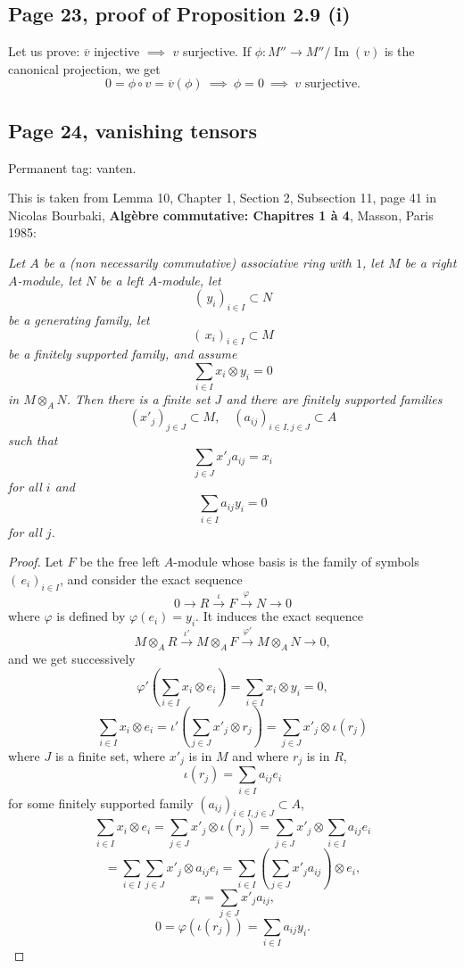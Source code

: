 \documentclass[parskip=half,fontsize=12pt]{scrartcl}%
\newcommand{\oo}{\operatorname}\newcommand{\ooo}{\operatorname*}
\begin{document}
\subsection{Page 23, proof of Proposition 2.9 (i)}%

Let us prove: $\overline v$ injective $\implies$ $v$ surjective. If $\phi:M''\to M''/\oo{Im}(v)$ is the canonical projection, we get 
$$
0=\phi\circ v=\overline v(\phi)\ \implies\ \phi=0\ \implies\ v\text{ surjective.}
$$

\subsection{Page 24, vanishing tensors}\label{vt}%

Permanent tag: vanten.

This is taken from Lemma 10, Chapter 1, Section 2, Subsection 11, page 41 in Nicolas Bourbaki, \textbf{Algèbre commutative: Chapitres 1 à 4}, Masson, Paris 1985:

\emph{Let $A$ be a (non necessarily commutative) associative ring with $1$, let $M$ be a right $A$-module, let $N$ be a left $A$-module, let 
$$
(\,y_i)_{i\in I}\subset N
$$ 
be a generating family, let 
$$
(\,x_i)_{i\in I}\subset M
$$ 
be a finitely supported family, and assume 
$$
\sum_{i\in I}x_i\otimes y_i=0
$$ 
in $M\otimes_AN$. Then there is a finite set $J$ and there are finitely supported families 
$$
(x'_j)_{j\in J}\subset M,\quad(a_{ij})_{i\in I,j\in J}\subset A
$$ 
such that 
$$
\sum_{j\in J} x'_ja_{ij}=x_i
$$ 
for all $i$ and 
$$
\sum_{i\in I}a_{ij}y_i=0
$$ 
for all $j$.}

\begin{proof} 
Let $F$ be the free left $A$-module whose basis is the family of symbols $(\,e_i)_{i\in I}$, and consider the exact sequence 
$$
0\to R\xrightarrow\iota F\xrightarrow\varphi N\to 0
$$ 
where $\varphi$ is defined by $\varphi(e_i)=y_i$. It induces the exact sequence 
$$
M\otimes_AR\xrightarrow{\iota'}M\otimes_AF\xrightarrow{\varphi'}M\otimes_AN\to 0,
$$ 
and we get successively
$$
\varphi'\left(\sum_{i\in I}x_i\otimes e_i\right)=\sum_{i\in I}x_i\otimes y_i=0,
$$ 
$$
\sum_{i\in I}x_i\otimes e_i=\iota'\left(\sum_{j\in J}x'_j\otimes r_j\right)=\sum_{j\in J}x'_j\otimes\iota(r_j)
$$ 
where $J$ is a finite set, where $x'_j$ is in $M$ and where $r_j$ is in $R$, 
$$
\iota(r_j)=\sum_{i\in I}a_{ij}e_i
$$ 
for some finitely supported family $(a_{ij})_{i\in I,j\in J}\subset A$, 
$$
\sum_{i\in I}x_i\otimes e_i=\sum_{j\in J}x'_j\otimes\iota(r_j)=\sum_{j\in J} x'_j\otimes\sum_{i\in I}a_{ij}e_i
$$
$$
=\sum_{i\in I}\sum_{j\in J} x'_j\otimes a_{ij}e_i=\sum_{i\in I}\left(\sum_{j\in J}x'_ja_{ij}\right)\otimes e_i,
$$ 
$$
x_i=\sum_{j\in J}x'_ja_{ij},
$$ 
$$
0=\varphi(\iota(r_j))=\sum_{i\in I}a_{ij}y_i.
$$ 
\end{proof}
\end{document}
